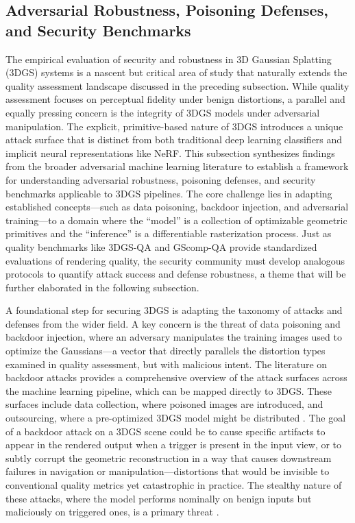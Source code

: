 \documentclass[11pt]{article}
\begin{document}
\subsection{Adversarial Robustness, Poisoning Defenses, and Security Benchmarks}

The empirical evaluation of security and robustness in 3D Gaussian Splatting (3DGS) systems is a nascent but critical area of study that naturally extends the quality assessment landscape discussed in the preceding subsection. While quality assessment focuses on perceptual fidelity under benign distortions, a parallel and equally pressing concern is the integrity of 3DGS models under adversarial manipulation. The explicit, primitive-based nature of 3DGS introduces a unique attack surface that is distinct from both traditional deep learning classifiers and implicit neural representations like NeRF. This subsection synthesizes findings from the broader adversarial machine learning literature to establish a framework for understanding adversarial robustness, poisoning defenses, and security benchmarks applicable to 3DGS pipelines. The core challenge lies in adapting established concepts---such as data poisoning, backdoor injection, and adversarial training---to a domain where the ``model'' is a collection of optimizable geometric primitives and the ``inference'' is a differentiable rasterization process. Just as quality benchmarks like 3DGS-QA and GScomp-QA provide standardized evaluations of rendering quality, the security community must develop analogous protocols to quantify attack success and defense robustness, a theme that will be further elaborated in the following subsection.

A foundational step for securing 3DGS is adapting the taxonomy of attacks and defenses from the wider field. A key concern is the threat of data poisoning and backdoor injection, where an adversary manipulates the training images used to optimize the Gaussians---a vector that directly parallels the distortion types examined in quality assessment, but with malicious intent. The literature on backdoor attacks provides a comprehensive overview of the attack surfaces across the machine learning pipeline, which can be mapped directly to 3DGS. These surfaces include data collection, where poisoned images are introduced, and outsourcing, where a pre-optimized 3DGS model might be distributed \cite{ref749}. The goal of a backdoor attack on a 3DGS scene could be to cause specific artifacts to appear in the rendered output when a trigger is present in the input view, or to subtly corrupt the geometric reconstruction in a way that causes downstream failures in navigation or manipulation---distortions that would be invisible to conventional quality metrics yet catastrophic in practice. The stealthy nature of these attacks, where the model performs nominally on benign inputs but maliciously on triggered ones, is a primary threat \cite{ref749}.
\end{document}
